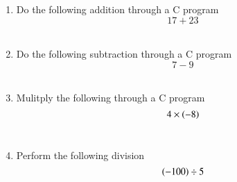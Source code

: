 \begin{enumerate}[label=\thesubsection.\arabic*, ref=\thesubsection.\theenumi]
\item Do the following addition through a C program
	$$17+23$$
	\\
	\solution
	
\item Do the following subtraction through a C program
$$7-9$$
	\\
	\solution
	
\item Mulitply the following through a C program
	$$4\times \left(-8\right)$$
	\\
	\solution
	
\item Perform the following division
	$$\left(-100\right)\div 5$$
	\\
	\solution
	
\end{enumerate}
